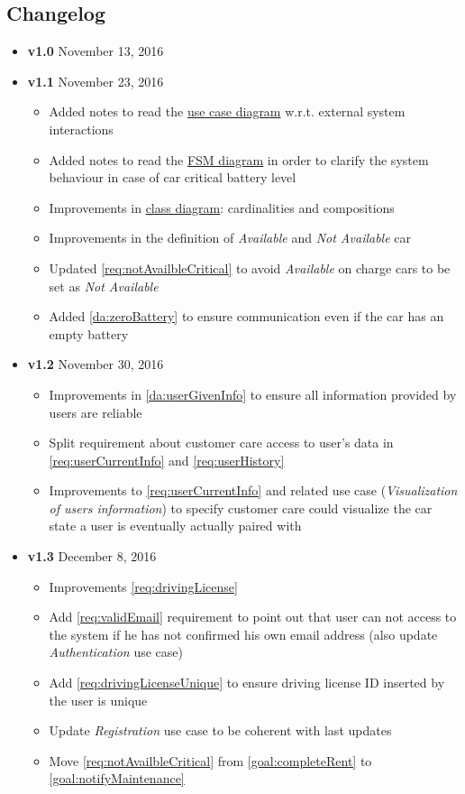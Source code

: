 \begin{appendices}
	\section{Changelog}
	\begin{itemize}
		\item \textbf{v1.0} November 13, 2016
		\item \textbf{v1.1} November 23, 2016
		\begin{itemize}
			\item Added notes to read the \hyperref[fig:usecase]{use case diagram} w.r.t. external system interactions
			\item Added notes to read the \hyperref[fig:carFSA]{FSM diagram} in order to clarify the system behaviour in case of car critical battery level
			\item Improvements in \hyperref[fig:classDiagram]{class diagram}: cardinalities and compositions
			\item Improvements in the definition of \emph{Available} and \emph{Not Available} car
			\item Updated \ref{req:notAvailbleCritical} to avoid \emph{Available} on charge cars to be set as \emph{Not Available}
			\item Added \ref{da:zeroBattery} to ensure communication even if the car has an empty battery
		\end{itemize}
		\item \textbf{v1.2} November 30, 2016
		\begin{itemize}
			\item Improvements in \ref{da:userGivenInfo} to ensure all information provided by users are reliable
			\item Split requirement about customer care access to user's data in
			\ref{req:userCurrentInfo} and \ref{req:userHistory}
			\item Improvements to \ref{req:userCurrentInfo} and related use case (\emph{Visualization of users information}) to specify
			customer care could visualize the car state a user is eventually actually paired with 
		\end{itemize}
		\item \textbf{v1.3} December 8, 2016
		\begin{itemize}
			\item Improvements \ref{req:drivingLicense}
			\item Add \ref{req:validEmail} requirement to point out that user can not access to the system if he has not confirmed his own email address (also update \emph{Authentication} use case)
			\item Add \ref{req:drivingLicenseUnique} to ensure driving license ID inserted by the user is unique
			\item Update \emph{Registration} use case to be coherent with last updates
			\item Move \ref{req:notAvailbleCritical} from \ref{goal:completeRent} to \ref{goal:notifyMaintenance}
		\end{itemize}
	\end{itemize}
\end{appendices}
